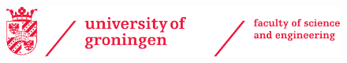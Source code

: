 \begin{titlepage}
%	

	
	
	
	
	\newpage \thispagestyle{empty}
	\vspace*{3.9cm}%
	
	
	\begin{figure}[!h]
		\includegraphics[width=\textwidth]{images/frontmatter/rugr_fse_logoen_rood_cmyk.pdf}
	\end{figure}
	

\end{titlepage}

